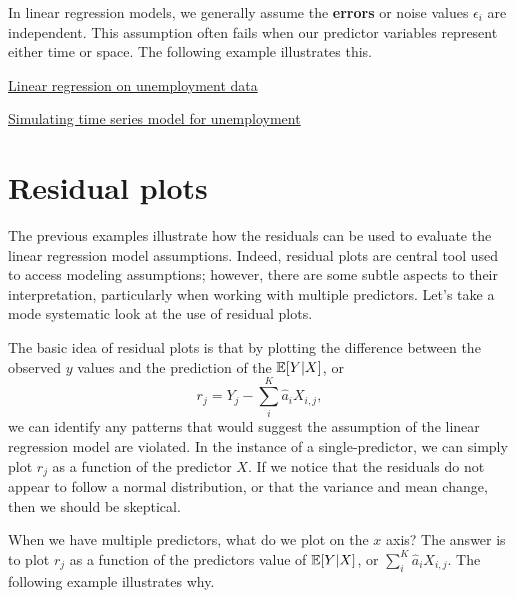 In linear regression models, we generally assume the {\bf errors} or noise values $\epsilon_i$ are independent.
This assumption often fails when our predictor variables represent either time or space. The following example illustrates this. 




\begin{example}
\href{https://colab.research.google.com/drive/1bBeb3k5xEjGInFtjhB7X8B0LXqkGI0Tn?usp=sharing}{Linear regression on unemployment data}
\end{example}

\begin{exercise}
\href{https://colab.research.google.com/drive/1bBeb3k5xEjGInFtjhB7X8B0LXqkGI0Tn?usp=sharing}{Simulating time series model for unemployment}
\end{exercise}




\section{Residual plots}

The previous examples illustrate how the residuals can be used to evaluate the linear regression model assumptions. Indeed, residual plots are central tool used to access modeling assumptions; however, there are some subtle aspects to their interpretation, particularly when working with multiple predictors. Let's take a mode systematic look at the use of residual plots. 

The basic idea of residual plots is that by plotting the difference between the observed $y$ values and the prediction of the $\mathbb E[Y|X]$, or 
\begin{equation}
r_j  = Y_j - \sum_i^{K} \hat{a}_iX_{i,j},
\end{equation}
we can identify any patterns that would suggest the assumption of the linear regression model are violated. In the instance of a single-predictor, we can simply plot $r_j$ as a function of the predictor $X$. If we notice that the residuals do not appear to follow a normal distribution, or that the variance and mean change, then we should be skeptical.


 When we have multiple predictors, what do we plot on the $x$ axis? The answer is to plot $r_j$ as a function of the predictors value of $\mathbb E[Y|X]$, or $\sum_i^{K} \hat{a}_iX_{i,j}$. The following example illustrates why. 


